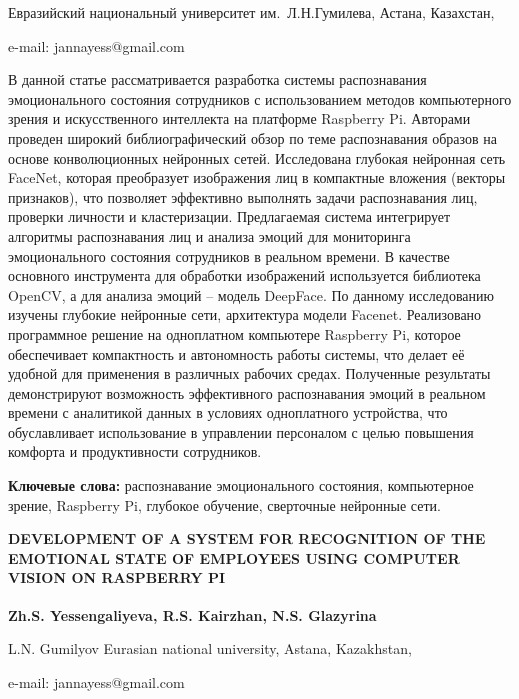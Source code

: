 \begin{affiliation}
Евразийский национальный университет им.~Л.Н.Гумилева, Астана, Казахстан,

e-mail: jannayess@gmail.com
\end{affiliation}

В данной статье рассматривается разработка системы распознавания
эмоционального состояния сотрудников с использованием методов
компьютерного зрения и искусственного интеллекта на платформе Raspberry
Pi. Авторами проведен широкий библиографический обзор по теме
распознавания образов на основе конволюционных нейронных сетей.
Исследована глубокая нейронная сеть FaceNet, которая преобразует
изображения лиц в компактные вложения (векторы признаков), что позволяет
эффективно выполнять задачи распознавания лиц, проверки личности и
кластеризации. Предлагаемая система интегрирует алгоритмы распознавания
лиц и анализа эмоций для мониторинга эмоционального состояния
сотрудников в реальном времени. В качестве основного инструмента для
обработки изображений используется библиотека OpenCV, а для анализа
эмоций -- модель DeepFace. По данному исследованию изучены глубокие
нейронные сети, архитектура модели Facenet. Реализовано программное
решение на одноплатном компьютере Raspberry Pi, которое обеспечивает
компактность и автономность работы системы, что делает её удобной для
применения в различных рабочих средах. Полученные результаты
демонстрируют возможность эффективного распознавания эмоций в реальном
времени с аналитикой данных в условиях одноплатного устройства, что
обуславливает использование в управлении персоналом с целью повышения
комфорта и продуктивности сотрудников.

{\bfseries Ключевые слова:} распознавание эмоционального состояния,
компьютерное зрение, Raspberry Pi, глубокое обучение, сверточные
нейронные сети.

\begin{articleheader}
{\bfseries DEVELOPMENT OF A SYSTEM FOR RECOGNITION OF THE EMOTIONAL STATE
OF EMPLOYEES USING COMPUTER VISION ON RASPBERRY PI}

{\bfseries
Zh.S. Yessengaliyeva\textsuperscript{\envelope },
R.S. Kairzhan,
N.S. Glazyrina
}
\end{articleheader}

\begin{affiliation}
L.N. Gumilyov Eurasian national university, Astana, Kazakhstan,

e-mail: jannayess@gmail.com
\end{affiliation}

